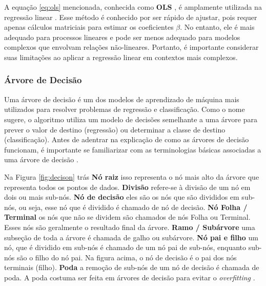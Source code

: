 A equação \eqref{eq:ols} mencionada, conhecida como \textbf{OLS} , é amplamente utilizada na regressão linear . Esse método é conhecido por ser rápido de ajustar, pois requer apenas cálculos matriciais para estimar os coeficientes $\beta$. No entanto, ele é mais adequado para processos lineares e pode ser menos adequado para modelos complexos que envolvam relações não-lineares. Portanto, é importante considerar suas limitações ao aplicar a regressão linear em contextos mais complexos.


\subsubsection{\'Arvore de Decis\~ao }


Uma árvore de decisão é um dos modelos de aprendizado de máquina mais utilizados para resolver problemas de regressão e classificação. Como o nome sugere, o algoritmo utiliza um modelo de decisões semelhante a uma árvore para prever o valor de destino (regressão) ou determinar a classe de destino (classificação). Antes de adentrar na explicação de como as árvores de decisão funcionam, é importante se familiarizar com as terminologias básicas associadas a uma árvore de decisão \cite{decision}.

Na Figura \ref{fig:decison} trás \textbf{Nó raiz} isso representa o nó mais alto da árvore que representa todos os pontos de dados.
\textbf{Divisão} refere-se à divisão de um nó em dois ou mais sub-nós.
\textbf{Nó de decisão} eles são os nós que são divididos em sub-nós, ou seja, esse nó que é dividido é chamado de nó de decisão.
\textbf{Nó Folha / Terminal} os nós que não se dividem são chamados de nós Folha ou Terminal. Esses nós são geralmente o resultado final da árvore.
\textbf{Ramo / Subárvore} uma subseção de toda a árvore é chamada de galho ou subárvore.
\textbf{Nó pai e filho} um nó, que é dividido em sub-nós é chamado de um nó pai de sub-nós, enquanto sub-nós são o filho do nó pai. Na figura acima, o nó de decisão é o pai dos nós terminais (filho).
\textbf{Poda} a remoção de sub-nós de um nó de decisão é chamada de poda. A poda costuma ser feita em árvores de decisão para evitar o \textit{overfitting}  \cite{decision}.

